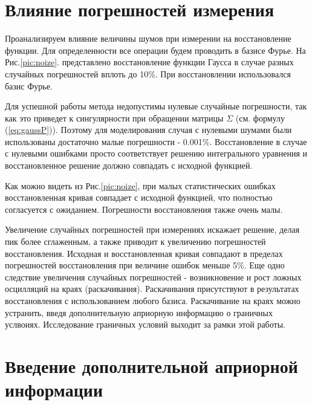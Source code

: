 \section{Влияние погрешностей измерения}

Проанализируем влияние величины шумов при измерении на восстановление функции. Для определенности все операции будем проводить в базисе Фурье. На Рис.\ref{pic:noize}. представлено восстановление функции Гаусса в случае разных случайных погрешностей вплоть до 10\%. При восстановлении использовался базис Фурье.

Для успешной работы метода недопустимы нулевые случайные погрешности, так как это приведет к сингулярности при обращении матрицы $\Sigma$ (см. формулу (\ref{eq:gaussP})). Поэтому для моделирования случая с нулевыми шумами были использованы достаточно малые погрешности - 0.001\%. Восстановление в случае с нулевыми ошибками просто соответствует решению интегрального уравнения и восстановленное решение должно совпадать с исходной функцией.

Как можно видеть из Рис.\ref{pic:noize}, при малых статистических ошибках восстановленная кривая совпадает с исходной функцией, что полностью согласуется с ожиданием. Погрешности восстановления также очень малы.

\begin{comment}
\begin{figure}[h! ]
	\center{\texttt{[image: pic12]}}
	\caption{Восстановление гаусса с разными погрешностями при измерении: 0.001\%, 1\%, 5\% и 10\%. Зеленая линия --- исходная функция, красная линия с точками --- результат восстановления.}
	\label{pic:noize}
\end{figure}
\end{comment}

Увеличение случайных погрешностей при измерениях искажает решение, делая пик более сглаженным, а также приводит к увеличению погрешностей восстановления. Исходная и восстановленная кривая совпадают в пределах погрешностей восстановления при величине ошибок меньше 5\%. Еще одно следствие увеличения случайных погрешностей - возникновение и рост ложных осцилляций на краях (раскачивания). Раскачивания присутствуют в результатах восстановления с использованием любого базиса. Раскачивание на краях можно устранить, введя дополнительную априорную информацию о граничных услвоиях. Исследование граничных условий выходит за рамки этой работы.


\section{Введение дополнительной априорной информации}

